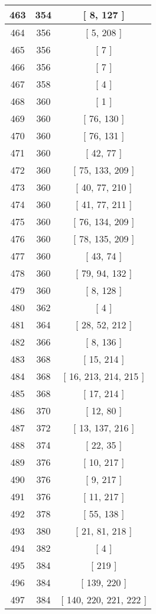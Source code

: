 \begin{center}
\begin{longtable}[H]{|| c c c ||}
\hline
463 & 354 & [ 8, 127 ] \\ 
\hline
464 & 356 & [ 5, 208 ] \\ 
\hline
465 & 356 & [ 7 ] \\ 
\hline
466 & 356 & [ 7 ] \\ 
\hline
467 & 358 & [ 4 ] \\ 
\hline
468 & 360 & [ 1 ] \\ 
\hline
469 & 360 & [ 76, 130 ] \\ 
\hline
470 & 360 & [ 76, 131 ] \\ 
\hline
471 & 360 & [ 42, 77 ] \\ 
\hline
472 & 360 & [ 75, 133, 209 ] \\ 
\hline
473 & 360 & [ 40, 77, 210 ] \\ 
\hline
474 & 360 & [ 41, 77, 211 ] \\ 
\hline
475 & 360 & [ 76, 134, 209 ] \\ 
\hline
476 & 360 & [ 78, 135, 209 ] \\ 
\hline
477 & 360 & [ 43, 74 ] \\ 
\hline
478 & 360 & [ 79, 94, 132 ] \\ 
\hline
479 & 360 & [ 8, 128 ] \\ 
\hline
480 & 362 & [ 4 ] \\ 
\hline
481 & 364 & [ 28, 52, 212 ] \\ 
\hline
482 & 366 & [ 8, 136 ] \\ 
\hline
483 & 368 & [ 15, 214 ] \\ 
\hline
484 & 368 & [ 16, 213, 214, 215 ] \\ 
\hline
485 & 368 & [ 17, 214 ] \\ 
\hline
486 & 370 & [ 12, 80 ] \\ 
\hline
487 & 372 & [ 13, 137, 216 ] \\ 
\hline
488 & 374 & [ 22, 35 ] \\ 
\hline
489 & 376 & [ 10, 217 ] \\ 
\hline
490 & 376 & [ 9, 217 ] \\ 
\hline
491 & 376 & [ 11, 217 ] \\ 
\hline
492 & 378 & [ 55, 138 ] \\ 
\hline
493 & 380 & [ 21, 81, 218 ] \\ 
\hline
494 & 382 & [ 4 ] \\ 
\hline
495 & 384 & [ 219 ] \\ 
\hline
496 & 384 & [ 139, 220 ] \\ 
\hline
497 & 384 & [ 140, 220, 221, 222 ] \\ 

\end{longtable}
\end{center}
